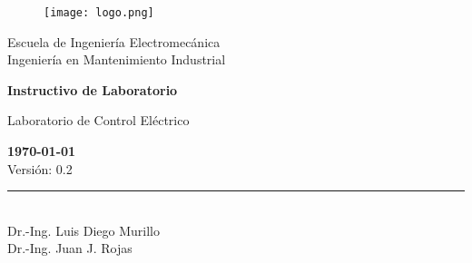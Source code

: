 \documentclass[12pt,letterpaper]{report}
\newcommand{\escuela}{Escuela de Ingeniería Electromecánica}
\newcommand{\programa}{Ingeniería en Mantenimiento Industrial}
\newcommand{\curso}{Laboratorio de Control Eléctrico}
\begin{document}
\begin{titlepage}

\begin{center}
\vspace*{1in}
\begin{figure}[htb]
\begin{center}
\texttt{[image: logo.png]}
\end{center}
\end{figure}
\vspace*{0.4in}
\begin{Large}
\escuela\\
\vspace*{0.15in}
\programa\\
\vspace*{0.8in}
\end{Large}
\vspace*{0.2in}
\begin{Large}
\textbf{Instructivo de Laboratorio} \\
\end{Large}
\vspace*{0.3in}
\begin{large}
\curso\\
\end{large}
\vspace*{2.5in}
\begin{tiny}
\textbf{\today}\\
Versión: 0.2\\
\end{tiny}
\rule{60mm}{0.1mm}\\
\vspace*{0.1 in}
Dr.-Ing. Luis Diego Murillo \\
Dr.-Ing. Juan J. Rojas
\end{center}

\end{titlepage}

\tableofcontents










\appendix







\end{document}
